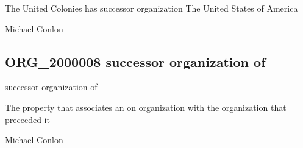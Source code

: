 \documentclass[letterpaper,10pt,english]{sphinxmanual}
\begin{document}
\begin{sphinxShadowBox}

\sphinxAtStartPar
The United Colonies has successor organization The United States of America
\end{sphinxShadowBox}

\begin{sphinxShadowBox}

\sphinxAtStartPar
Michael Conlon 
\end{sphinxShadowBox}
\begin{quote}

\ignorespaces \end{quote}


\subsection{ORG\_2000008 \sphinxhyphen{} successor organization of}
\label{\detokenize{doc-ORG_2000008:org-2000008-successor-organization-of}}\label{\detokenize{doc-ORG_2000008:index-0}}\label{\detokenize{doc-ORG_2000008::doc}}
\begin{sphinxShadowBox}

\sphinxAtStartPar
successor organization of
\end{sphinxShadowBox}

\begin{sphinxShadowBox}

\sphinxAtStartPar
{}
\end{sphinxShadowBox}

\begin{sphinxShadowBox}

\sphinxAtStartPar
The property that associates an on organization with the organization that preceeded it
\end{sphinxShadowBox}

\begin{sphinxShadowBox}

\sphinxAtStartPar
Michael Conlon 
\end{sphinxShadowBox}
\end{document}
